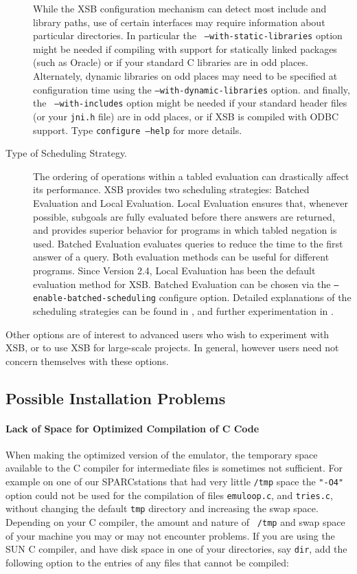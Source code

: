 \begin{description}
While the XSB configuration mechanism can detect most include and
library paths, use of certain interfaces may require information about
particular directories.  In particular the {\tt
--with-static-libraries} option might be needed if compiling with
support for statically linked packages (such as Oracle) or if your
standard C libraries are in odd places. Alternately, dynamic libraries
on odd places may need to be specified at configuration time using the
{\tt --with-dynamic-libraries} option.  and finally, the {\tt
--with-includes} option might be needed if your standard header files
(or your {\tt jni.h} file) are in odd places, or if XSB is compiled
with ODBC support.  Type {\tt configure --help} for more details.

\item[Type of Scheduling Strategy.]  The ordering of operations within
a tabled evaluation can drastically affect its performance.  XSB
provides two scheduling strategies: Batched Evaluation and Local
Evaluation.  Local Evaluation ensures that, whenever possible,
subgoals are fully evaluated before there answers are returned, and
provides superior behavior for programs in which tabled negation is
used.  Batched Evaluation evaluates queries to reduce the time to the
first answer of a query.  Both evaluation methods can be useful for
different programs.  Since Version 2.4, Local Evaluation has been the
default evaluation method for XSB.  Batched Evaluation can be chosen
via the {\tt --enable-batched-scheduling} configure option.  Detailed
explanations of the scheduling strategies can be found in
\cite{JFLP-Scheduling}, and further experimentation in \cite{CaSW02}.

%
\end{description}

Other options are of interest to advanced users who wish to experiment
with XSB, or to use XSB for large-scale projects.  In general, however
users need not concern themselves with these options.

\subsection{Possible Installation Problems}


\paragraph*{Lack of Space for Optimized Compilation of C Code}
When making the optimized version of the emulator, the temporary space
available to the C compiler for intermediate files is sometimes not
sufficient. For example on one of our SPARCstations that had very
little {\tt /tmp} space the {\tt "-O4"} option could not be used for
the compilation of files {\tt emuloop.c}, and {\tt tries.c}, without
changing the default {\tt tmp} directory and increasing the swap
space.  Depending on your C compiler, the amount and nature of {\tt
/tmp} and swap space of your machine you may or may not encounter
problems.  If you are using the SUN C compiler, and have disk space in
one of your directories, say {\tt dir}, add the following option to
the entries of any files that cannot be compiled:

